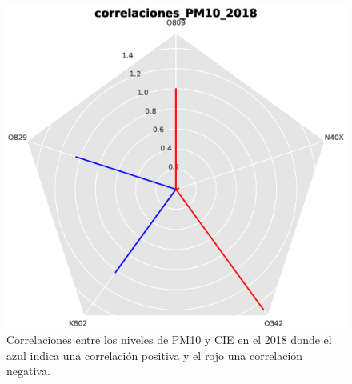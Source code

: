 \begin{figure}[h!]
\setcounter{figure}{3} %
\captionsetup{type=figure} %
\begin{center}
   \includegraphics[trim=0 0 0 23,clip,width=1\textwidth]{spiderweb_correlaciones_PM10_2018}
   \end{center}
    \caption[Correlaciones 2018 PM10]{Correlaciones entre los niveles de PM10 y CIE en el 2018 donde el azul indica una correlación positiva y el rojo una correlación negativa.}
    \label{correlaciones_2018_PM10}
\end{figure}

